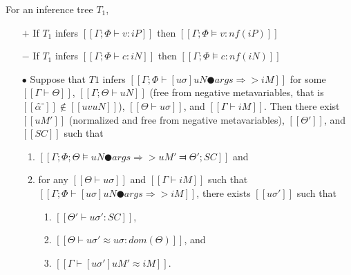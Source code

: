 \begin{lemma}
    \label{lemma:typing-completeness}
    For an inference tree $T_1$,
    \begin{itemize}
        \item [$+$] If $T_1$ infers $[[Γ; Φ ⊢ v : iP]]$ then $[[Γ; Φ ⊨ v : nf(iP)]]$        
        \item [$-$] If $T_1$ infers $[[Γ; Φ ⊢ c : iN]]$ then  $[[Γ; Φ ⊨ c : nf(iN)]]$
        \item [$\bullet$] Suppose that 
            $T1$ infers $[[Γ; Φ ⊢ [uσ]uN ● args ⇒> iM]]$ for some
            $[[Γ ⊢ Θ]]$,
            $[[Γ; Θ ⊢ uN]]$ (free from negative metavariables, that is $[[α̂⁻]] \notin [[uv uN]]$), 
            $[[Θ ⊢ uσ]]$, and $[[Γ ⊢ iM]]$. Then
            there exist $[[uM']]$ (normalized and free from negative metavariables),
            $[[Θ']]$, and $[[SC]]$ such that
            \begin{enumerate}
                \item $[[ Γ; Φ; Θ ⊨ uN ● args ⇒> uM' ⫤ Θ'; SC ]]$ and
                \item for any $[[Θ ⊢ uσ]]$ and $[[Γ ⊢ iM]]$
                    such that $[[Γ; Φ ⊢ [uσ]uN ● args ⇒> iM]]$, 
                    there exists $[[uσ']]$ such that 
                    \begin{enumerate}
                        \item $[[Θ' ⊢ uσ' : SC]]$,
                        \item $[[Θ ⊢ uσ' ≈ uσ : dom(Θ)]]$, and 
                        \item $[[Γ ⊢ [uσ']uM' ≈ iM]]$.
                    \end{enumerate}
            \end{enumerate}
    \end{itemize}
\end{lemma}
